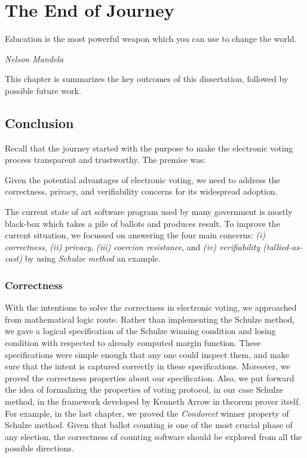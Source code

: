 \chapter{The End of Journey}
\label{cha:conc}

\epigraph{Education is the most powerful weapon which you can use to change the world.} 
{\textit{Nelson Mandela}}

This chapter is summarizes the key outcomes of this dissertation, followed by possible 
future work. 

\section{Conclusion}
Recall that the journey started with the purpose to make the electronic voting 
process transparent and trustworthy.  The premise was:

\begin{displayquote}
Given the potential advantages of electronic voting, we need to address the correctness,
privacy, and verifiability concerns for its widespread adoption.
\end{displayquote}

The current state of 
art software program used by many government is mostly black-box which 
takes a pile of ballots and produces result.  To improve the current situation, 
we focussed on answering the 
four main concerns: \textit{(i) correctness}, \textit{(ii) privacy},
\textit{(iii) coercion resistance}, and \textit{(iv) verifiability (tallied-as-cast)} by 
using \textit{Schulze method} an example. 

\subsection{Correctness}
With the intentions to solve the 
correctness in electronic voting, we approached from 
mathematical logic route.  Rather than implementing the Schulze method, 
we gave a logical specification of the Schulze winning condition and losing 
condition with respected to already computed margin function. 
These specifications were simple enough that 
any one could inspect them, and 
make sure that the intent is captured correctly in these specifications. 
Moreover, we proved the correctness properties about our specification.
Also, we put forward the idea of formalizing the properties 
of voting protocol, in our case Schulze method, in the framework developed by Kenneth Arrow 
in theorem prover itself. For example, 
in the last chapter, we proved the \textit{Condorcet} winner property 
of Schulze method. Given that ballot counting is one of the most 
crucial phase of any election, the correctness of counting software 
should be explored from all the possible directions. 

